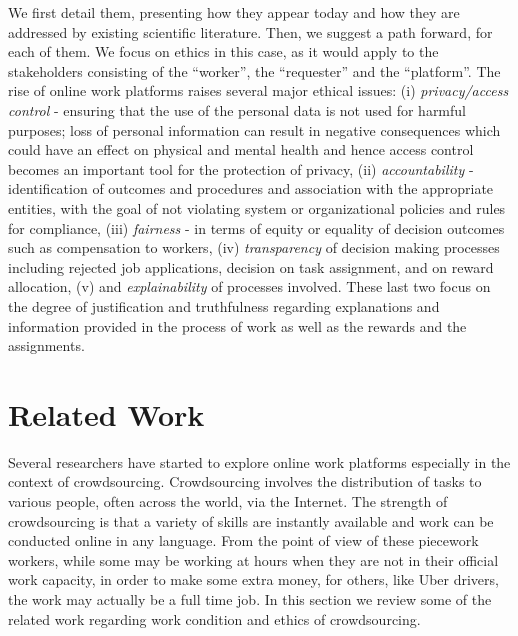 \documentclass[11pt]{article}
\begin{document}
We  first detail them, presenting how they appear today and how they are addressed by existing scientific literature. Then, we suggest a path forward, for each of them. We focus on ethics in this case, as it would apply to the stakeholders consisting of the “worker”, the “requester” and the “platform”. The rise of  online work platforms raises several  major ethical issues: 
(i) \textit{privacy/access control} - ensuring that the use of the personal data is not used for harmful purposes; 
loss of personal information can result in negative consequences which could have an effect on physical and mental health
and  hence access control becomes an important tool for the protection of privacy, (ii) \textit{accountability} - identification of outcomes and procedures and association with the appropriate entities, with the goal of not violating system or organizational policies and rules for compliance, (iii) \textit{fairness} - in terms of equity or equality of decision outcomes such as compensation to workers, (iv) \textit{transparency} of decision making processes including rejected job applications, decision on task assignment, and on reward allocation,  (v) and \textit{explainability} of processes involved. These last two  focus on the degree of justification and truthfulness regarding explanations and information provided in the process of work as well as the rewards and the assignments.

\section{Related Work}

Several researchers have started to explore online work platforms especially in the context of crowdsourcing. Crowdsourcing involves the distribution of tasks to various people, often across the world, via the Internet. The strength of crowdsourcing is that a variety of skills are instantly available and work can be conducted online in any language. From the point of view of these piecework workers, while some may be working at hours when they are not in their official work capacity, in order to make some extra money, for others, like Uber drivers, the work may actually be a full time job. In this section we review some of the related work regarding work condition and ethics of crowdsourcing.
\end{document}
